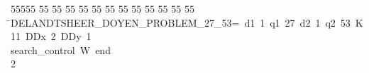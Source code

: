 %
%
\begin{tabbing}
55555 \= 55 \= 55 \= 55 \= 55 \= 55 \= 55 \= 55 \= 55 \= 55 \= 55 \= 55 \= 55 \= \>DELANDTSHEER\_DOYEN\_PROBLEM\_27\_53=\ d1\ 1\ q1\ 27\ d2\ 1\ q2\ 53\ K\ 11\ DDx\ 2\ DDy\ 1\ \\[0pt]
\>search\_control\ W\ end\ \\[0pt]
2\>\end{tabbing}
